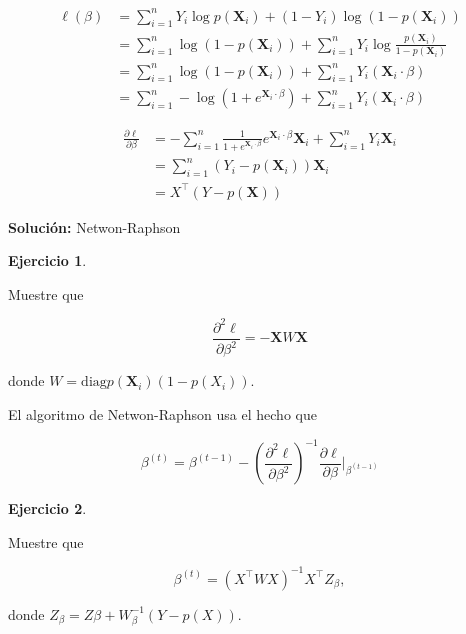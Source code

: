 \documentclass[
  12pt,
]{book}
\theoremstyle{definition}
\theoremstyle{definition}
\theoremstyle{definition}
\newtheorem{exercise}{Ejercicio}[chapter]
\theoremstyle{remark}
\begin{document}
\begin{align*}
\ell\left(\beta\right) 
&=\sum_{i=1}^{n} Y_{i} \log p\left(\boldsymbol{X}_{i}\right)+\left(1-Y_{i}\right) \log \left(1-p\left(\boldsymbol{X}_{i}\right)\right) \\
&=\sum_{i=1}^{n} \log \left(1-p\left(\boldsymbol{X}_{i}\right)\right)+\sum_{i=1}^{n} Y_{i} \log \frac{p\left(\boldsymbol{X}_{i}\right)}{1-p\left(\boldsymbol{X}_{i}\right)} \\
&=\sum_{i=1}^{n} \log \left(1-p\left(\boldsymbol{X}_{i}\right)\right)+\sum_{i=1}^{n} Y_{i}\left(\boldsymbol{X}_{i} \cdot \beta\right) \\
&=\sum_{i=1}^{n}-\log \left(1+e^{\boldsymbol{X}_{i} \cdot \beta}\right)+\sum_{i=1}^{n} Y_{i}\left(\boldsymbol{X}_{i} \cdot \beta\right)
\end{align*}

\begin{align*}
\frac{\partial \ell}{\partial \beta} 
&=-\sum_{i=1}^{n} \frac{1}{1+e^{\boldsymbol{X}_{i} \cdot \beta}} e^{\boldsymbol{X}_{i} \cdot \beta} \boldsymbol{X}_{i}+\sum_{i=1}^{n} Y_{i} \boldsymbol{X}_{i} \\
&=\sum_{i=1}^{n}\left(Y_{i}-p\left(\boldsymbol{X}_{i}\right)\right) \boldsymbol{X}_{i} \\
&= X^{\top}(Y-p(\boldsymbol{X}))
\end{align*}

\textbf{Solución:} Netwon-Raphson

\begin{exercise}
\protect\hypertarget{exr:unlabeled-div-50}{}\label{exr:unlabeled-div-50}

Muestre que

\begin{equation*}
\frac{\partial^{2} \ell}{\partial \beta^{2}} = -\boldsymbol{X}W\boldsymbol{X} 
\end{equation*}

donde \(W = \mathrm{diag}{p(\boldsymbol{X}_{i})(1-p(X_{i}))}\).

\end{exercise}

El algoritmo de Netwon-Raphson usa el hecho que

\begin{equation*}
\beta^{(t)} = \beta ^{(t-1)} - \left(  \frac{\partial^{2} \ell}{\partial \beta^{2}}\right)^{-1} \frac{\partial \ell}{\partial \beta}  \Bigg\vert_{\beta ^{(t-1)}}
\end{equation*}

\begin{exercise}
\protect\hypertarget{exr:unlabeled-div-51}{}\label{exr:unlabeled-div-51}

Muestre que

\begin{equation*}
\beta^{(t)} = \left( X^{\top}WX \right)^{-1}X^{\top}Z_{\beta},
\end{equation*}

donde \(Z_{\beta} = Z\beta + W^{-1}_{\beta} (Y-p(X))\).

\end{exercise}
\end{document}

